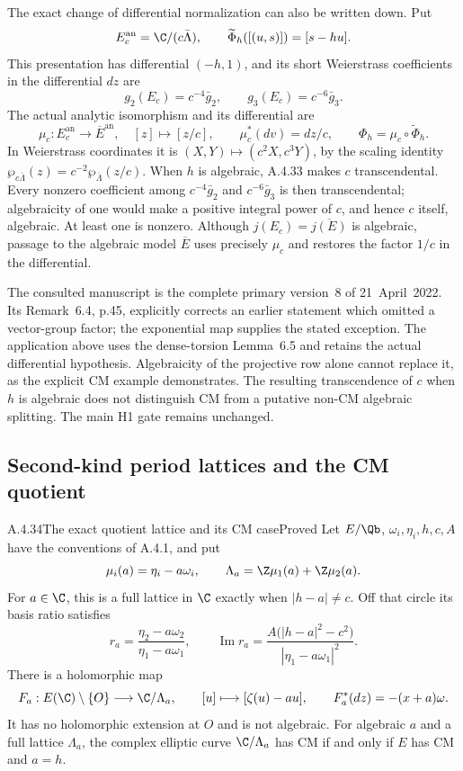 The exact change of differential normalization can also be
written down. Put
\[
 E_c^{\mathrm{an}}=\C/(c\bar\Lambda),\qquad
 \widetilde\Phi_h([(u,s)])=[s-hu].
\]
This presentation has differential $(-h,1)$, and its
short Weierstrass coefficients in the differential $dz$ are
\[
 g_2(E_c)=c^{-4}\bar g_2,\qquad
 g_3(E_c)=c^{-6}\bar g_3.
\]
The actual analytic isomorphism and its differential are
\[
 \mu_c:E_c^{\mathrm{an}}\longrightarrow\overline E^{\mathrm{an}},
 \quad[z]\longmapsto[z/c],\qquad
 \mu_c^*(dv)=dz/c,\qquad
 \Phi_h=\mu_c\circ\widetilde\Phi_h.
\]
In Weierstrass coordinates it is $(X,Y)\mapsto(c^2X,c^3Y)$,
by the scaling identity
$\wp_{c\bar\Lambda}(z)=c^{-2}\wp_{\bar\Lambda}(z/c)$.
When $h$ is algebraic, A.4.33 makes $c$ transcendental.
Every nonzero coefficient among $c^{-4}\bar g_2$ and
$c^{-6}\bar g_3$ is then transcendental; algebraicity of
one would make a positive integral power of $c$, and hence
$c$ itself, algebraic. At least one is nonzero.
Although $j(E_c)=\overline{j(E)}$ is algebraic, passage to
the algebraic model $\overline E$ uses precisely $\mu_c$
and restores the factor $1/c$ in the differential.

The consulted manuscript is the complete primary version~8
of 21~April~2022. Its Remark~6.4, p.45, explicitly corrects
an earlier statement which omitted a vector-group factor;
the exponential map supplies the stated exception.
The application above uses the dense-torsion Lemma~6.5
and retains the actual differential hypothesis.
Algebraicity of the projective row alone cannot replace it,
as the explicit CM example demonstrates.
The resulting transcendence of $c$ when $h$ is algebraic
does not distinguish CM from a putative non-CM algebraic
splitting. The main H1 gate remains unchanged.

\subsection{Second-kind period lattices and the CM quotient}

\begin{result}{A.4.34}{The exact quotient lattice and its CM case}{Proved}
Let $E/\Qb$, $\omega_i,\eta_i,h,c,A$ have the conventions of A.4.1,
and put
\[
 \mu_i(a)=\eta_i-a\omega_i,\qquad
 \Lambda_a=\Z\mu_1(a)+\Z\mu_2(a).
\]
For $a\in\C$, this is a full lattice in $\C$ exactly when
$|h-a|\ne c$. Off that circle its basis ratio satisfies
\[
 r_a=\frac{\eta_2-a\omega_2}{\eta_1-a\omega_1},
 \qquad
 \operatorname{Im}r_a
 =\frac{A\bigl(|h-a|^2-c^2\bigr)}
        {|\eta_1-a\omega_1|^2}.
\]
There is a holomorphic map
\[
 F_a:E(\C)\setminus\{O\}\longrightarrow \C/\Lambda_a,
 \qquad [u]\longmapsto[\zeta(u)-au],
 \qquad F_a^*(dz)=-(x+a)\omega.
\]
It has no holomorphic extension at $O$ and is not algebraic.
For algebraic $a$ and a full lattice $\Lambda_a$, the complex elliptic
curve $\C/\Lambda_a$ has CM if and only if $E$ has CM and $a=h$.
\end{result}

